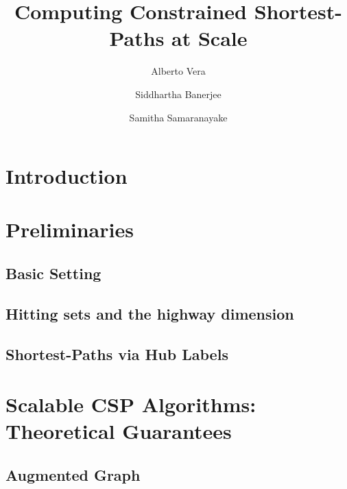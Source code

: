 \documentclass[format=acmsmall, screen=true]{acmart}
\begin{document}
\title{Computing Constrained Shortest-Paths at Scale}  
\author{Alberto Vera}
\author{Siddhartha Banerjee}
\author{Samitha Samaranayake}

\begin{abstract}

\end{abstract}

\maketitle


\section{Introduction}


\section{Preliminaries}
\label{sec:prelim}

\subsection{Basic Setting}
\label{ssec:basic}


\subsection{Hitting sets and the highway dimension}
\label{ssec:hddef}


\subsection{Shortest-Paths via Hub Labels}
\label{ssec:hldef}


\section{Scalable CSP Algorithms:\texorpdfstring{\\}{ } Theoretical Guarantees}
\label{sec:chd}


\subsection{Augmented Graph}
\label{ssec:aug}

\end{document}
